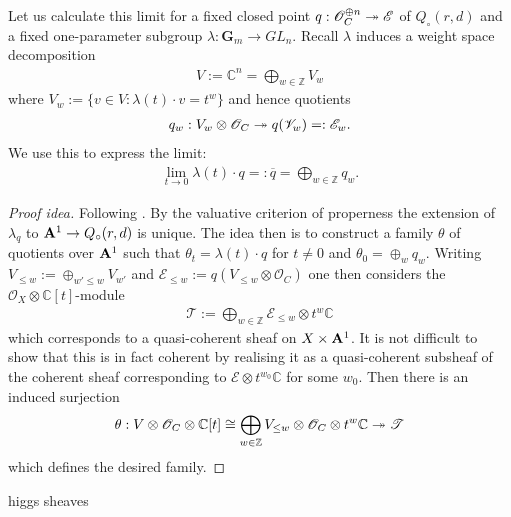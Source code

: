 \documentclass[12pt]{ociamthesis}  %
\begin{document}
\begin{example}\label{ex:lf_limits}
  Let us calculate this limit for a fixed closed point
  $q : \mathscr O^{\oplus n}_C \twoheadrightarrow \mathscr E$ of $Q_\circ(r,d)$
  and a fixed one-parameter subgroup $\lambda : \mathbf G_m \to GL_n$.
  Recall $\lambda$ induces a weight space decomposition
  \begin{align*}
    V := \mathbb C^n  = \bigoplus_{w\in\mathbb Z} V_w
  \end{align*}
  where $V_w := \{v \in V : \lambda(t)\cdot v = t^w\}$ and hence
  quotients
  \begin{align*}
    q_w : V_w\otimes\mathscr O_C \twoheadrightarrow q(\mathscr V_w) =: \mathscr E_w.
  \end{align*}
  We use this to express the limit:
  \begin{align*}
    \lim_{t\to 0} \lambda(t)\cdot q =: \overline{q} = \bigoplus_{w\in\mathbb Z} q_w.
  \end{align*}
  \begin{proof}[Proof idea]
    Following \cite[Lemma 4.4]{huybrechts2010}.
    By the valuative criterion of properness the extension
    of $\lambda_q$ to $\mathbf{A}^{1}_{}\to Q_\circ(r,d)$ is unique.
    The idea then is to construct a family $\theta$
    of quotients over $\mathbf{A}^{1}_{}$ such that $\theta_t = \lambda(t)\cdot q$
    for $t\neq 0$ and $\theta_0 = \oplus_w q_w$. Writing
    $V_{\leq w} :=\oplus_{w'\leq w} V_{w'}$ and $\mathscr E_{\leq w} := q(V_{\leq w} \otimes \mathscr O_C)$
    one then considers the $\mathscr O_X\otimes\mathbb C[t]$-module
    \begin{align*}
      \mathscr T := \bigoplus_{w\in\mathbb Z} \mathscr E_{\leq w}\otimes t^w\mathbb C
    \end{align*}
    which corresponds to a quasi-coherent sheaf on $X\times\mathbf{A}^{1}_{}$.
    It is not difficult to show that this is in fact coherent by
    realising it as a quasi-coherent subsheaf of the coherent sheaf
    corresponding to $\mathscr E\otimes t^{w_0}\mathbb C$ for some $w_0$.
    Then there is an induced surjection
    \begin{align*}
      \theta : V\otimes\mathscr O_C \otimes \mathbb C[t]
      \cong\bigoplus_{w\in\mathbb Z} V_{\leq w}\otimes\mathscr O_C\otimes t^w\mathbb C
      \twoheadrightarrow \mathscr T
    \end{align*}
    which defines the desired family.
  \end{proof}
\end{example}

\begin{example}
  higgs sheaves \missingexample
\end{example}
\end{document}
